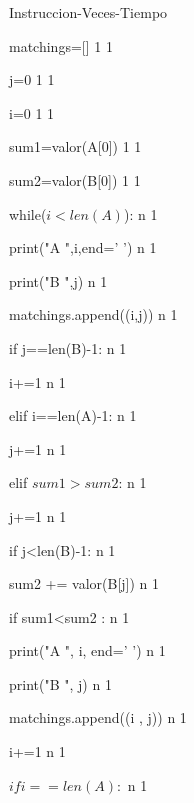 \documentclass{article}
\begin{document}
Instruccion-Veces-Tiempo

    matchings=[]  1    1
            
    j=0    1    1
        
    i=0   1    1
        
    sum1=valor(A[0])  1    1
    
    sum2=valor(B[0])  1    1
    
    while($i<len(A)$):  n    1
    
    print("A ",i,end=' ')   n    1 
        
        print("B ",j)      n    1
        
        matchings.append((i,j))                                     n    1
        
        if j==len(B)-1:                                             n    1
        
            i+=1                                                    n    1
            
        elif i==len(A)-1:                                           n    1
        
            j+=1                                                    n    1
            
        elif $sum1 > sum2$:                                         n    1
        
            j+=1                                                    n    1
            
            if j<len(B)-1:                                          n    1
            
                sum2 += valor(B[j])                                 n    1
                
                if sum1<sum2 :                                      n    1
                
                    print("A ", i, end=' ')                         n    1
                
                    print("B ", j)                                  n    1
                    
                    matchings.append((i , j))                       n    1
                
                    i+=1                                            n    1
                
                    $if i==len(A):$                                 n    1
                
\end{document}
